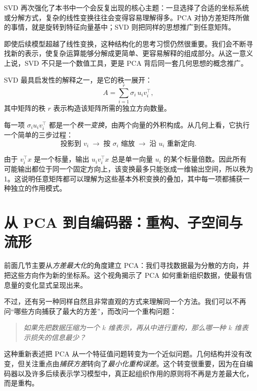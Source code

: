 SVD 再次强化了本书中一个会反复出现的核心主题：一旦选择了合适的坐标系统或分解方式，复杂的线性变换往往会变得容易理解得多。PCA 对协方差矩阵所做的事情，就是旋转到特征向量基中；SVD 则把同样的思想推广到任意矩阵。

即使后续模型超越了线性变换，这种结构化的思考习惯仍然很重要。我们会不断寻找新的表示，使复杂运算能够分解成更简单、更容易解释的组成部分。从这一意义上说，SVD 不只是一个数值工具，更是 PCA 背后同一套几何思想的概念推广。

\begin{tcolorbox}[
  colback=blue!6,
  colframe=blue!55!black,
  title={秩一结构与矩阵的几何含义},
  boxrule=0.8pt,
  arc=2mm,
  left=2mm,
  right=2mm,
  top=1mm,
  bottom=1mm
]

SVD 最具启发性的解释之一，是它的秩一展开：
\[
A = \sum_{i=1}^r \sigma_i\,u_i v_i^\top,
\]
其中矩阵的秩 \(r\) 表示构造该矩阵所需的独立方向数量。

每一项 \(\sigma_i u_i v_i^\top\) 都是一个\emph{秩一变换}，由两个向量的外积构成。从几何上看，它执行一个简单的三步过程：
\[
\text{投影到 }v_i
\;\rightarrow\;
\text{按 }\sigma_i\text{ 缩放}
\;\rightarrow\;
\text{沿 }u_i\text{ 重新定向}.
\]

由于 \(v_i^\top x\) 是一个标量，输出 \(u_i v_i^\top x\) 总是单一向量 \(u_i\) 的某个标量倍数。因此所有可能输出都位于同一个固定方向上，该变换最多只能张成一维输出空间，所以秩为 1。这说明任意矩阵都可以理解为这些基本外积变换的叠加，其中每一项都捕获一种独立的作用模式。

\end{tcolorbox}

\section{从 PCA 到自编码器：重构、子空间与流形}

前面几节主要从\emph{方差最大化}的角度建立 PCA：我们寻找数据最为分散的方向，并把这些方向作为新的坐标系。这个视角揭示了 PCA 如何重新组织数据，使最有信息量的变化显式呈现出来。

不过，还有另一种同样自然且非常直观的方式来理解同一个方法。我们可以不再问“哪些方向捕获了最大的方差”，而改问一个重构问题：
\begin{quote}
\emph{如果先把数据压缩为一个 \(k\) 维表示，再从中进行重构，那么哪一种 \(k\) 维表示损失的信息最少？}
\end{quote}
这种重新表述把 PCA 从一个特征值问题转变为一个近似问题。几何结构并没有改变，但关注重点由\emph{捕获方差}转向了\emph{最小化重构误差}。这个转变很重要，因为在自编码器以及许多后续表示学习模型中，真正起组织作用的原则将不再是方差最大化，而是重构。

